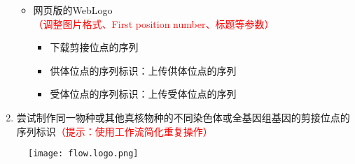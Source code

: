 \documentclass{TIJMUjiaoanSY}
\begin{document}
\begin{enumerate}
\begin{itemize}
      \item 网页版的WebLogo\textcolor{red}{（调整图片格式、First position number、标题等参数）}
	\begin{itemize}
	  \item 下载剪接位点的序列
	  \item 供体位点的序列标识：上传供体位点的序列
	  \item 受体位点的序列标识：上传受体位点的序列
	\end{itemize}
    \end{itemize}
  \item 尝试制作同一物种或其他真核物种的不同染色体或全基因组基因的剪接位点的序列标识\textcolor{red}{（提示：使用工作流简化重复操作）}
\end{enumerate}

\begin{figure}[ht]
  \centering
  \texttt{[image: flow.logo.png]}
\end{figure}


\otherTail
\end{document}
